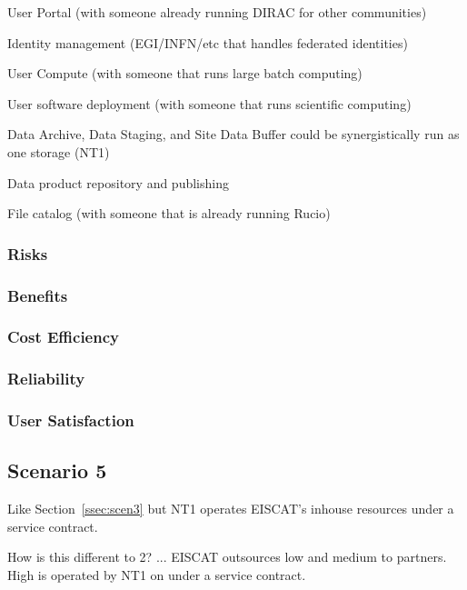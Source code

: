 \documentclass[12pt,a4paper]{article}
\begin{document}
User Portal (with someone already running DIRAC for other communities)

Identity management (EGI/INFN/etc that handles federated identities)

User Compute (with someone that runs large batch computing)

User software deployment (with someone that runs scientific computing)

Data Archive, Data Staging, and Site Data Buffer could be synergistically run as one storage (NT1)

Data product repository and publishing

File catalog (with someone that is already running Rucio)

\subsubsection*{Risks}
\bitm
\item 
\eitm

\subsubsection*{Benefits}
\bitm
\item 
\eitm

\subsubsection*{Cost Efficiency}
\bitm
\item 
\eitm

\subsubsection*{Reliability}
\bitm
\item 
\eitm

\subsubsection*{User Satisfaction}
\bitm
\item 
\eitm
\subsection{Scenario 5}
\label{ssec:scen5}

Like Section~\ref{ssec:scen3} but NT1 operates EISCAT's inhouse resources under a service contract.

How is this different to 2? ... EISCAT outsources low and medium to partners. High is operated by NT1 on under a service contract.
\end{document}
